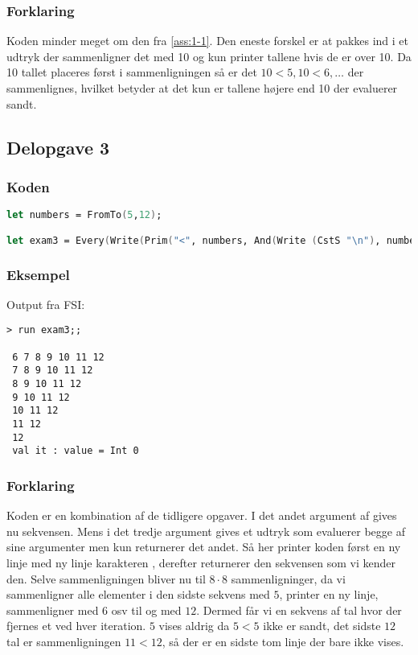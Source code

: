 \subsubsection{Forklaring}
Koden minder meget om den fra \ref{ass:1-1}. Den eneste forskel er at  pakkes ind i et  udtryk der sammenligner det med 10 og kun printer tallene hvis de er over 10. Da 10 tallet placeres først i sammenligningen så er det $10<5,10<6,\ldots$  der sammenlignes, hvilket betyder at det kun er tallene højere end 10 der evaluerer sandt.

\subsection{Delopgave 3}\label{ass:1-3}
\subsubsection{Koden}
\begin{lstlisting}[language=fsharp]
let numbers = FromTo(5,12);

let exam3 = Every(Write(Prim("<", numbers, And(Write (CstS "\n"), numbers))));
\end{lstlisting}

\subsubsection{Eksempel}
Output fra FSI:
\begin{lstlisting}
> run exam3;;

 6 7 8 9 10 11 12
 7 8 9 10 11 12
 8 9 10 11 12
 9 10 11 12
 10 11 12
 11 12
 12
 val it : value = Int 0
\end{lstlisting}

\subsubsection{Forklaring}
Koden er en kombination af de tidligere opgaver. I det andet argument af  gives nu sekvensen. Mens i det tredje argument gives et  udtryk som evaluerer begge af sine argumenter men kun returnerer det andet. Så her printer koden først en ny linje med ny linje karakteren \li{\n}, derefter returnerer den  sekvensen som vi kender den. Selve sammenligningen bliver nu til $8\cdot8$ sammenligninger, da vi sammenligner alle elementer i den sidste sekvens med $5$, printer en ny linje, sammenligner med $6$ osv til og med $12$. Dermed får vi en sekvens af tal hvor der fjernes et ved hver iteration. $5$ vises aldrig da $5<5$ ikke er sandt, det sidste $12$ tal er sammenligningen $11<12$, så der er en sidste tom linje der bare ikke vises.


